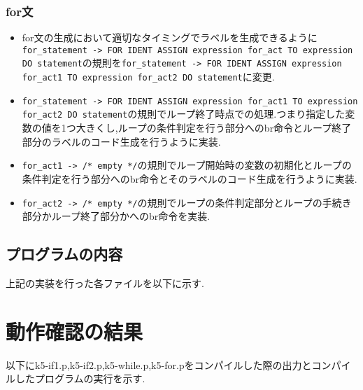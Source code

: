 \documentclass[main]{subfiles}
\begin{document}
\subsubsection{for文}
\begin{oframed}
\begin{itemize}
    \item for文の生成において適切なタイミングでラベルを生成できるように\verb|for_statement -> FOR IDENT ASSIGN expression for_act TO expression DO statement|の規則を\verb|for_statement -> FOR IDENT ASSIGN expression for_act1 TO expression for_act2 DO statement|に変更.
    \item \verb|for_statement -> FOR IDENT ASSIGN expression for_act1 TO expression for_act2 DO statement|の規則でループ終了時点での処理.つまり指定した変数の値を1つ大きくし,ループの条件判定を行う部分へのbr命令とループ終了部分のラベルのコード生成を行うように実装.
    \item \verb|for_act1 -> /* empty */|の規則でループ開始時の変数の初期化とループの条件判定を行う部分へのbr命令とそのラベルのコード生成を行うように実装.
    \item \verb|for_act2 -> /* empty */|の規則でループの条件判定部分とループの手続き部分かループ終了部分かへのbr命令を実装.
\end{itemize}
\end{oframed}

\subsection{プログラムの内容}
上記の実装を行った各ファイルを以下に示す.






\section{動作確認の結果}
以下にk5-if1.p,k5-if2.p,k5-while.p,k5-for.pをコンパイルした際の出力とコンパイルしたプログラムの実行を示す.
\end{document}
